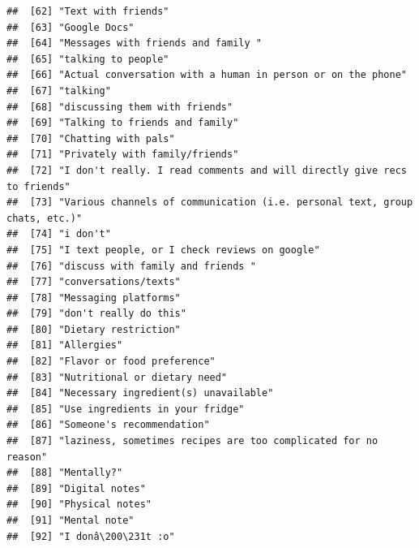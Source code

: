 \documentclass[
]{article}
\begin{document}
\begin{verbatim}
##  [62] "Text with friends"                                                        
##  [63] "Google Docs"                                                              
##  [64] "Messages with friends and family "                                        
##  [65] "talking to people"                                                        
##  [66] "Actual conversation with a human in person or on the phone"               
##  [67] "talking"                                                                  
##  [68] "discussing them with friends"                                             
##  [69] "Talking to friends and family"                                            
##  [70] "Chatting with pals"                                                       
##  [71] "Privately with family/friends"                                            
##  [72] "I don't really. I read comments and will directly give recs to friends"   
##  [73] "Various channels of communication (i.e. personal text, group chats, etc.)"
##  [74] "i don't"                                                                  
##  [75] "I text people, or I check reviews on google"                              
##  [76] "discuss with family and friends "                                         
##  [77] "conversations/texts"                                                      
##  [78] "Messaging platforms"                                                      
##  [79] "don't really do this"                                                     
##  [80] "Dietary restriction"                                                      
##  [81] "Allergies"                                                                
##  [82] "Flavor or food preference"                                                
##  [83] "Nutritional or dietary need"                                              
##  [84] "Necessary ingredient(s) unavailable"                                      
##  [85] "Use ingredients in your fridge"                                           
##  [86] "Someone's recommendation"                                                 
##  [87] "laziness, sometimes recipes are too complicated for no reason"            
##  [88] "Mentally?"                                                                
##  [89] "Digital notes"                                                            
##  [90] "Physical notes"                                                           
##  [91] "Mental note"                                                              
##  [92] "I donâ\200\231t :o"                                                             

\end{verbatim}
\end{document}

